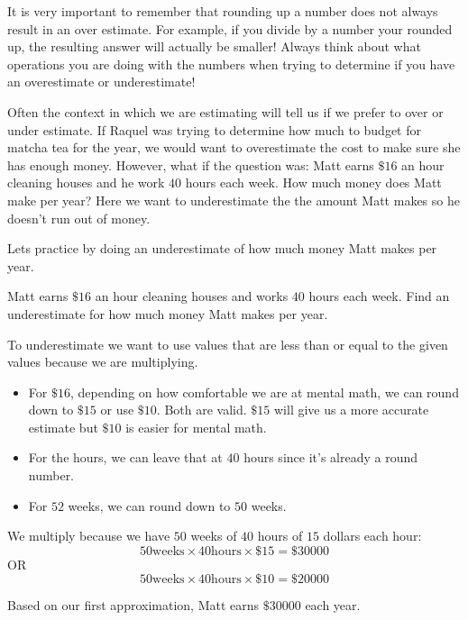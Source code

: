 \documentclass{ximera}
\begin{document}
\begin{remark}
It is very important to remember that rounding up a number does not always result in an over estimate.  For example, if you divide by a number your rounded up, the resulting answer will actually be smaller!  Always think about what operations you are doing with the numbers when trying to determine if you have an overestimate or underestimate!
\end{remark}

Often the context in which we are estimating will tell us if we prefer to over or under estimate.  If Raquel was trying to determine how much to budget for matcha tea for the year, we would want to overestimate the cost to make sure she has enough money.  However, what if the question was: Matt earns $\$16$ an hour cleaning houses and he work $40$ hours each week. How much money does Matt make per year? Here we want to underestimate the the amount Matt makes so he doesn't run out of money. 

Lets practice by doing an underestimate of how much money Matt makes per year.

\begin{example}
 Matt earns $\$16$ an hour cleaning houses and works $40$ hours each week. Find an underestimate for how much money Matt makes per year.

\begin{explanation}
To underestimate we want to use values that are less than or equal to the given values because we are multiplying. 
\begin{itemize}
\item For $\$16$, depending on how comfortable we are at mental math, we can round down to $\$15$ or use $\$10$. Both are valid. $\$15$ will give us a more accurate estimate but $\$10$ is easier for mental math.  
\item For the hours, we can leave that at $40$ hours since it's already a round number.
\item For $52$ weeks, we can round down to $50$ weeks.
\end{itemize}

We multiply because we have $50$ weeks of $40$ hours of $15$ dollars each hour:
$$50 \text{weeks} \times 40 \text{hours} \times \$15 =\$30000$$
OR $$50 \text{weeks} \times 40 \text{hours} \times \$10 =\$20000$$

Based on our first approximation, Matt earns $\$30000$ each year.
\end{explanation}
\end{example}
\end{document}
